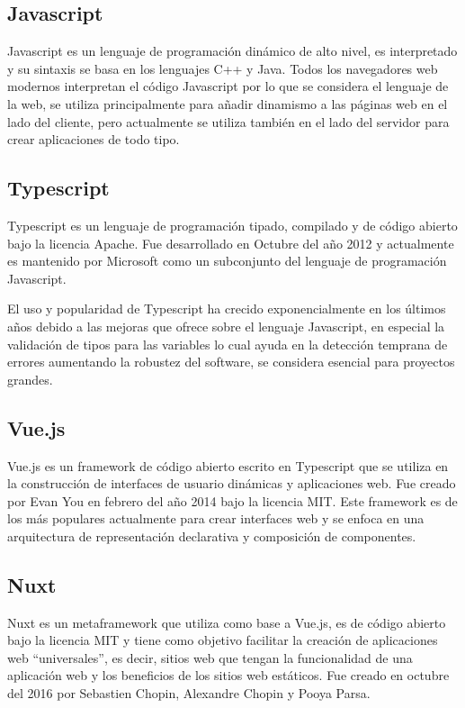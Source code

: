 \subsection{Javascript}

Javascript es un lenguaje de programación dinámico de alto nivel, es interpretado y su sintaxis se basa en los lenguajes C++ y Java. Todos los navegadores web modernos interpretan el código Javascript por lo que se considera el lenguaje de la web, se utiliza principalmente para añadir dinamismo a las páginas web en el lado del cliente, pero actualmente se utiliza también en el lado del servidor para crear aplicaciones de todo tipo.

\subsection{Typescript}

Typescript es un lenguaje de programación tipado, compilado y de código abierto bajo la licencia Apache. Fue desarrollado en Octubre del año 2012 y actualmente es mantenido por Microsoft como un subconjunto del lenguaje de programación Javascript.  

El uso y popularidad de Typescript ha crecido exponencialmente en los últimos años debido a las mejoras que ofrece sobre el lenguaje Javascript, en especial la validación de tipos para las variables lo cual ayuda en la detección temprana de errores aumentando la robustez del software, se considera esencial para proyectos grandes.

\subsection{Vue.js}

Vue.js es un framework de código abierto escrito en Typescript que se utiliza en la construcción de interfaces de usuario dinámicas y aplicaciones web. Fue creado por Evan You en febrero del año 2014 bajo la licencia MIT. Este framework es de los más populares actualmente para crear interfaces web y se enfoca en una arquitectura de representación declarativa y composición de componentes. 

\subsection{Nuxt}

Nuxt es un metaframework que utiliza como base a Vue.js, es de código abierto bajo la licencia MIT y tiene como objetivo facilitar la creación de aplicaciones web “universales”, es decir, sitios web que tengan la funcionalidad de una aplicación web y los beneficios de los sitios web estáticos. Fue creado en octubre del 2016 por Sebastien Chopin, Alexandre Chopin y Pooya Parsa.

